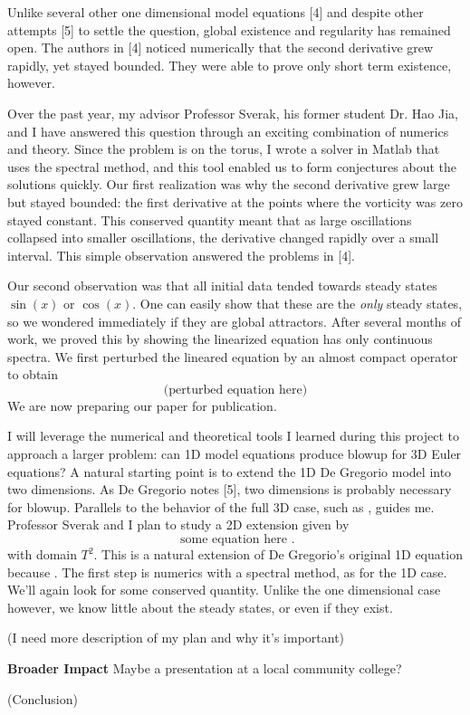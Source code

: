 \documentclass[12pt]{article}
\begin{document}
Unlike several other one dimensional model equations [4] and despite other attempts [5] to settle the question, global existence and regularity has remained open. The authors in [4] noticed numerically that the second derivative grew rapidly, yet stayed bounded. They were able to prove only short term existence, however.

Over the past year, my advisor Professor Sverak, his former student Dr. Hao Jia, and I have answered this question through an exciting combination of numerics and theory. Since the problem is on the torus, I wrote a solver in Matlab that uses the spectral method, and this tool enabled us to form conjectures about the solutions quickly. Our first realization was why the second derivative grew large but stayed bounded: the first derivative at the points where the vorticity was zero stayed constant. This conserved quantity meant that as large oscillations collapsed into smaller oscillations, the derivative changed rapidly over a small interval. This simple observation answered the problems in [4].

Our second observation was that all initial data tended towards steady states $\sin(x)$ or $\cos(x)$. One can easily show that these are the \textit{only} steady states, so we wondered immediately if they are global attractors. After several months of work, we proved this by showing the linearized equation has only continuous spectra. We first perturbed the lineared equation by an almost compact operator to obtain 
\[
	\textrm{(perturbed equation here)}
\]
We are now preparing our paper for publication.

I will leverage the numerical and theoretical tools I learned during this project to approach a larger problem: can 1D model equations produce blowup for 3D Euler equations? A natural starting point is to extend the 1D De Gregorio model into two dimensions. As De Gregorio notes [5], two dimensions is probably necessary for blowup. Parallels to the behavior of the full 3D case, such as , guides me. Professor Sverak and I plan to study a 2D extension given by
\[
	\textrm{ some equation here }.
\]
with domain $T^2$. This is a natural extension of De Gregorio's original 1D equation because . The first step is numerics with a spectral method, as for the 1D case. We'll again look for some conserved quantity. Unlike the one dimensional case however, we know little about the steady states, or even if they exist. 

(I need more description of my plan and why it's important)

\textbf{Broader Impact}
Maybe a presentation at a local community college?

(Conclusion)
\end{document}
